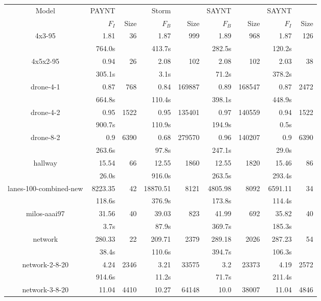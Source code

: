 \begin{table}
\begin{tabular}{|c|rr|rr|rr|rr|}
\hline

Model & PAYNT & & Storm & & SAYNT & & SAYNT & \\ 

 & $F_{I}$ & Size & $F_{B}$ & Size & $F_{B}$ & Size & $F_{I}$ & Size \\ \hline 

4x3-95 & 1.81 & 36 & 1.87 & 999 & 1.89 & 968 & 1.87 & 126 \\
 & 764.0s & & 413.7s & & 282.5s & & 120.2s & \\
\hline
4x5x2-95 & 0.94 & 26 & 2.08 & 102 & 2.08 & 102 & 2.03 & 38 \\
 & 305.1s & & 3.1s & & 71.2s & & 378.2s & \\
\hline
drone-4-1 & 0.87 & 768 & 0.84 & 169887 & 0.89 & 168547 & 0.87 & 2472 \\
 & 664.8s & & 110.4s & & 398.1s & & 448.9s & \\
\hline
drone-4-2 & 0.95 & 1522 & 0.95 & 135401 & 0.97 & 140559 & 0.94 & 1522 \\
 & 900.7s & & 110.9s & & 194.9s & & 0.5s & \\
\hline
drone-8-2 & 0.9 & 6390 & 0.68 & 279570 & 0.96 & 140207 & 0.9 & 6390 \\
 & 263.6s & & 97.8s & & 247.1s & & 29.0s & \\
\hline
hallway & 15.54 & 66 & 12.55 & 1860 & 12.55 & 1820 & 15.46 & 86 \\
 & 26.0s & & 916.0s & & 263.5s & & 293.4s & \\
\hline
lanes-100-combined-new & 8223.35 & 42 & 18870.51 & 8121 & 4805.98 & 8092 & 6591.11 & 34 \\
 & 118.6s & & 376.9s & & 173.8s & & 114.4s & \\
\hline
milos-aaai97 & 31.56 & 40 & 39.03 & 823 & 41.99 & 692 & 35.82 & 40 \\
 & 3.7s & & 87.9s & & 369.7s & & 185.3s & \\
\hline
network & 280.33 & 22 & 209.71 & 2379 & 289.18 & 2026 & 287.23 & 54 \\
 & 38.4s & & 110.6s & & 394.7s & & 106.3s & \\
\hline
network-2-8-20 & 4.24 & 2346 & 3.21 & 33575 & 3.2 & 23373 & 4.19 & 2572 \\
 & 914.6s & & 11.2s & & 71.7s & & 211.4s & \\
\hline
network-3-8-20 & 11.04 & 4410 & 10.27 & 64148 & 10.0 & 38007 & 11.04 & 4846 \\

\end{tabular}
\end{table}
